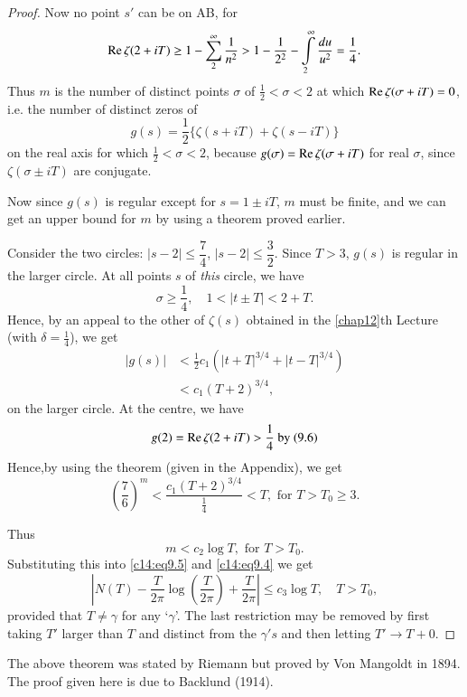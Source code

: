 \begin{proof}
Now no point $s'$ can be on AB, for 
\begin{equation}
\operatorname{Re} \zeta (2+iT) \geq 1 - \sum\limits^\infty_2 \frac{1}{n^2} > 1 -
\frac{1}{2^2}  - \int\limits^\infty_2 \frac{du}{u^2} = \frac{1}{4}.
\label{c14:eq9.6}
\end{equation}
Thus $m$ is the number of distinct points $\sigma$ of $\frac{1}{2} <
\sigma < 2$ at which $\operatorname{Re} \zeta (\sigma + i T) =0$, i.e. the number of
distinct zeros of 
$$
g(s) = \frac{1}{2} \{\zeta (s + iT) + \zeta(s-iT)\}
$$
on the real axis for which $\frac{1}{2} <\sigma < 2$, because
$g(\sigma) = \operatorname{Re} \zeta(\sigma + iT)$ for real $\sigma$, since $\zeta
(\sigma \pm iT)$ are conjugate.

Now since $g(s)$ is regular except for $s=1\pm iT$, $m$ must be
finite, and we can get an upper bound for $m$ by using a theorem
proved earlier. 

Consider the two circles: $|s - 2 | \leq \dfrac{7}{4}$, $|s-2| \leq
\dfrac{3}{2}$. Since $T>3$, $g(s)$ is regular in the larger circle. At
all points $s$ of {\em this} circle, we have
$$
\sigma \geq \frac{1}{4}, \quad 1 < |t \pm T| < 2 + T.
$$
Hence, by an appeal to the other of $\zeta(s)$ obtained in the \ref{chap12}th
Lecture (with $\delta=\frac{1}{4}$), we get
\begin{align*}
|g(s)| & < \frac{1}{2} c_1 \left(|t+T|^{3/4} + |t-T|^{3/4}\right)\\
& < c_1 (T+2)^{3/4},
\end{align*}
on the larger circle. At the centre, we have 
$$
g(2) = \operatorname{Re} \zeta(2+iT)  > \frac{1}{4} \text{ by (9.6)}
$$
Hence,\pageoriginale by using the theorem (given in the Appendix), we
get
$$
\left(\frac{7}{6} \right)^m <\frac{c_1(T+2)^{3/4}}{\frac{1}{4}} < T , \text{ for }
T > T_0 \geq 3.
$$

Thus 
$$
m < c_2 \log T, \text{ for }T > T_0.
$$
Substituting this into \eqref{c14:eq9.5} and \eqref{c14:eq9.4} we get
$$
\left|N(T) -\frac{T}{2\pi} \log \left(\frac{T}{2\pi}\right) + \frac{T}{2\pi}
\right| \leq c_3 \log T, \quad T > T_0,
$$
provided that $T \neq \gamma$ for any `$\gamma$'. The last restriction
may be removed by first taking $T'$ larger than $T$ and distinct from
the $\gamma's$ and then letting $T'\to T +0$.
\end{proof}

\begin{remarks*}
The above theorem was stated by Riemann but proved by Von Mangoldt in
1894. The proof given here is due to Backlund (1914).
\end{remarks*}

